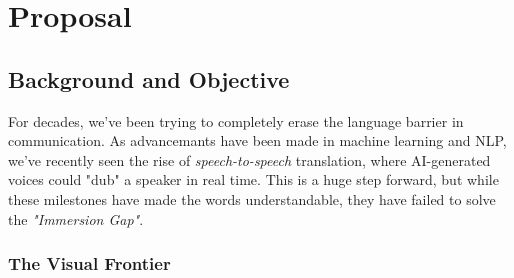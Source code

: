 \chapter{Proposal}




\section{Background and Objective}

For decades, we've been trying to completely erase the language barrier in communication. As advancemants have been made in machine learning and NLP, we've recently seen the rise of \textit{speech-to-speech} translation, where AI-generated voices could "dub" a speaker in real time. This is a huge step forward, but while these milestones have made the words understandable, they have failed to solve the \textit{"Immersion Gap"}.

\subsection{The Visual Frontier}

